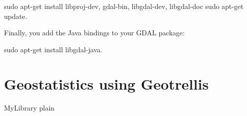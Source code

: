 \documentclass {article}
\begin{document}
sudo apt-get install libproj-dev, gdal-bin, libgdal-dev, libgdal-doc
sudo apt-get update.

Finally, you add the Java bindings to your GDAL package:

sudo apt-get install libgdal-java.    



\section {Geostatistics using Geotrellis}

 {MyLibrary}
 {plain}
\end{document}
